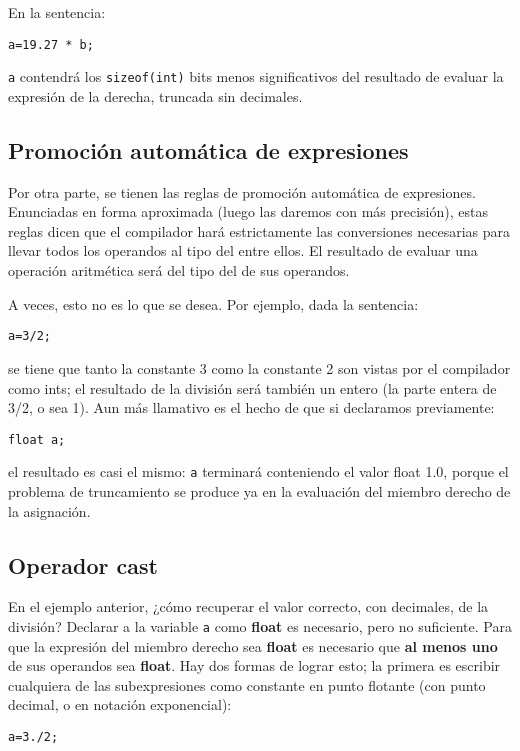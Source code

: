 En la sentencia:
\begin{lstlisting}
a=19.27 * b;	
\end{lstlisting}
\lstinline{a} contendrá los \lstinline{sizeof(int)} bits menos significativos del resultado de evaluar la expresión de la
derecha, truncada sin decimales.

\subsection{Promoción automática de expresiones}

Por otra parte, se tienen las reglas de promoción automática de expresiones. Enunciadas en forma
aproximada (luego las daremos con más precisión), estas reglas dicen que el compilador hará
estrictamente las conversiones necesarias para llevar todos los operandos al tipo del  entre ellos. El
resultado de evaluar una operación aritmética será del tipo del  de sus operandos.

A veces, esto no es lo que se desea. Por ejemplo, dada la sentencia:
\begin{lstlisting}
a=3/2;
\end{lstlisting}

se tiene que tanto la constante 3 como la constante 2 son vistas por el compilador como ints; el
resultado de la división será también un entero (la parte entera de 3/2, o sea 1). Aun más llamativo es
el hecho de que si declaramos previamente:
\begin{lstlisting}
float a;
\end{lstlisting}
el resultado es casi el mismo: \lstinline{a} terminará conteniendo el valor float 1.0, porque el problema de
truncamiento se produce ya en la evaluación del miembro derecho de la asignación.


\subsection{Operador cast}
En el ejemplo anterior, ¿cómo recuperar el valor correcto, con decimales, de la división? Declarar a la variable \lstinline{a} como \textbf{float} es necesario,
pero no suficiente. Para que la expresión del miembro derecho sea \textbf{float} es necesario que \textbf{al menos uno}
de sus operandos sea \textbf{float}. Hay dos formas de lograr esto; la primera es escribir cualquiera de las
subexpresiones como constante en punto flotante (con punto decimal, o en notación exponencial):
\begin{lstlisting}
a=3./2;
\end{lstlisting}

